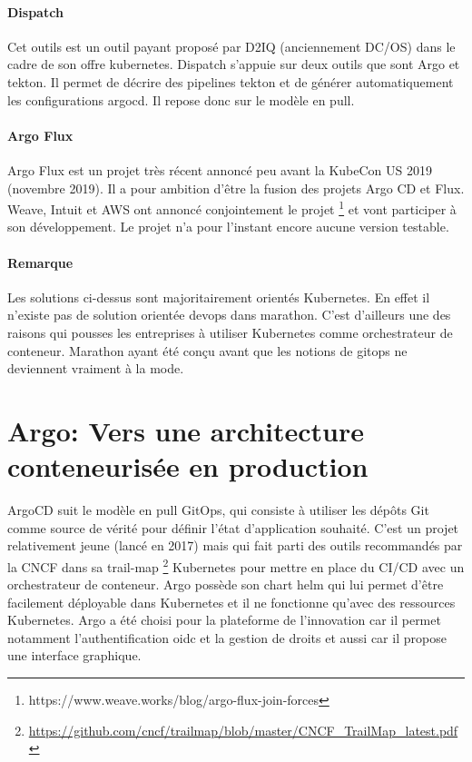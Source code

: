 \documentclass[11pt,fleqn]{book} %
\begin{document}
\paragraph{Dispatch}
Cet outils est un outil payant proposé par D2IQ (anciennement DC/OS) dans le cadre de son offre kubernetes. Dispatch s'appuie sur deux outils que sont Argo et tekton. Il permet de décrire des pipelines tekton et de générer automatiquement les configurations argocd. Il repose donc sur le modèle en pull.

\paragraph{Argo Flux}
Argo Flux est un projet très récent annoncé peu avant la KubeCon US 2019 (novembre 2019). Il a pour ambition d’être la fusion des projets Argo CD et Flux. Weave, Intuit et AWS ont annoncé conjointement le projet  \footnote{https://www.weave.works/blog/argo-flux-join-forces} et vont participer à son développement. Le projet n'a pour l'instant encore aucune version testable.

\begin{interrupt}
\paragraph{Remarque}
Les solutions ci-dessus sont majoritairement orientés Kubernetes. En effet il n'existe pas de solution orientée devops dans marathon. C'est d'ailleurs une des raisons qui pousses les entreprises à utiliser Kubernetes comme orchestrateur de conteneur. Marathon ayant été conçu avant que les notions de gitops ne deviennent vraiment à la mode.
\end{interrupt}
\section{Argo: Vers une architecture conteneurisée en production}

ArgoCD suit le modèle en pull GitOps, qui consiste à utiliser les dépôts Git comme source de vérité pour définir l'état d'application souhaité. C'est un projet relativement jeune (lancé en 2017) mais qui fait parti des outils recommandés par la CNCF dans sa trail-map \footnote{\url{https://github.com/cncf/trailmap/blob/master/CNCF_TrailMap_latest.pdf}} Kubernetes pour mettre en place du CI/CD avec un orchestrateur de conteneur. Argo possède son chart helm qui lui permet d'être facilement déployable dans Kubernetes et il ne fonctionne qu'avec des ressources Kubernetes. Argo a été choisi pour la plateforme de l'innovation car il permet notamment l'authentification oidc et la gestion de droits et aussi car il propose une interface graphique. 
\end{document}
